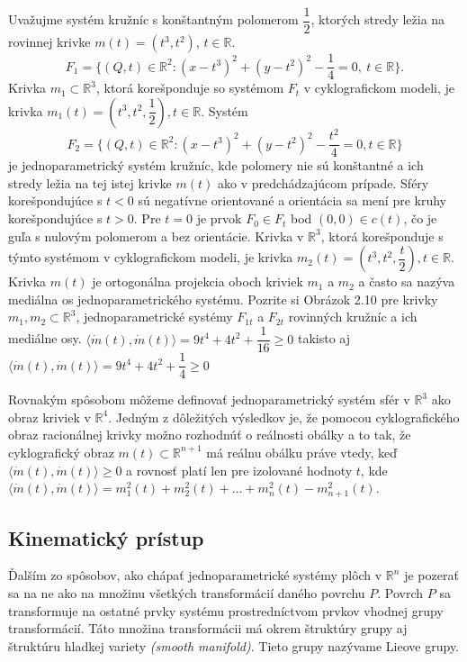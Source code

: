 \begin{example}
Uvažujme systém kružníc s konštantným polomerom $\dfrac{1}{2}$, ktorých stredy ležia na rovinnej krivke $m(t) = (t^3, t^2)$, $t \in \mathbb{R}$.
$$F_{1} = \{(Q, t) \in \mathbb{R}^2 : (x - t^3)^2 + (y - t^2)^2 - \dfrac{1}{4} = 0, \ t \in \mathbb{R} \}.$$
Krivka $m_1 \subset \mathbb{R}^3$, ktorá korešponduje so systémom $F_{t}$ v cyklografickom modeli, je krivka $m_1(t) = (t^3, t^2, \dfrac{1}{2}), t \in \mathbb{R}$.
Systém 
$$F_{2} = \{(Q, t) \in \mathbb{R}^2 : (x - t^3)^2 + (y - t^2)^2 - \frac{t^2}{4} = 0, t \in \mathbb{R} \}$$
je jednoparametrický systém kružníc, kde polomery nie sú konštantné a ich stredy ležia na tej istej krivke $m(t)$ ako v predchádzajúcom prípade. Sféry korešpondujúce s $t < 0$ sú negatívne orientované a orientácia sa mení pre kruhy korešpondujúce s $t > 0$. Pre $t = 0$ je prvok $F_0 \in F_t$ bod $(0, 0) \in c(t)$, čo je guľa s nulovým polomerom a bez orientácie.
Krivka v $\mathbb{R}^3$, ktorá korešponduje s týmto systémom v cyklografickom modeli, je krivka $m_2(t) = (t^3, t^2, \dfrac{t}{2}), t \in \mathbb{R}$.
Krivka $m(t)$ je ortogonálna projekcia oboch kriviek $m_1$ a $m_2$ a často sa nazýva mediálna os jednoparametrického systému.
Pozrite si Obrázok 2.10 pre krivky $m_1, m_2 \subset \mathbb{R}^3$, jednoparametrické systémy $F_{1t}$ a $F_{2t}$ rovinných kružníc a ich mediálne osy.
$\langle \dot{m}(t), \dot{m}(t) \rangle = 9t^4 + 4t^2 + \dfrac{1}{16} \geq 0$
takisto aj 
$\langle \dot{m}(t), \dot{m}(t) \rangle = 9t^4 + 4t^2 + \dfrac{1}{4} \geq 0$
\end{example}

Rovnakým spôsobom môžeme definovať jednoparametrický systém sfér v $\mathbb{R}^3$ ako obraz kriviek v $\mathbb{R}^4$.
Jedným z dôležitých výsledkov je, že pomocou cyklografického obraz racionálnej krivky možno rozhodnúť o reálnosti obálky a to tak, že cyklografický obraz $m(t) \subset \mathbb{R}^{n+1}$ má reálnu obálku práve vtedy, keď $\langle \dot{m}(t), \dot{m}(t) \rangle \geq 0$ a rovnosť platí len pre izolované hodnoty $t$, kde $\langle \dot{m}(t), \dot{m}(t) \rangle = m_1^2(t) + m_2^2(t) + \ldots + m_n^2(t) - m_{n+1}^2(t).$

\subsection{Kinematický prístup}
Ďalším zo spôsobov, ako chápať jednoparametrické systémy plôch v $\mathbb{R}^n$ je pozerať sa na ne ako na množinu všetkých transformácií daného povrchu $P$. Povrch $P$ sa transformuje na ostatné prvky systému prostredníctvom prvkov vhodnej grupy transformácií. Táto množina transformácii má okrem štruktúry grupy aj štruktúru hladkej variety \textit{(smooth manifold)}. Tieto grupy nazývame Lieove grupy.

